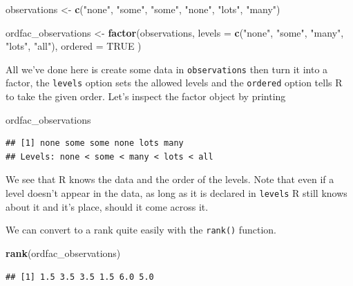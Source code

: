 \documentclass[
]{book}
\newenvironment{Shaded}{\begin{snugshade}}{\end{snugshade}}
\newcommand{\DataTypeTok}[1]{\textcolor[rgb]{0.13,0.29,0.53}{#1}}
\newcommand{\KeywordTok}[1]{\textcolor[rgb]{0.13,0.29,0.53}{\textbf{#1}}}
\newcommand{\NormalTok}[1]{#1}
\newcommand{\OtherTok}[1]{\textcolor[rgb]{0.56,0.35,0.01}{#1}}
\newcommand{\StringTok}[1]{\textcolor[rgb]{0.31,0.60,0.02}{#1}}
\begin{document}
\begin{Shaded}
\begin{Highlighting}[]
\NormalTok{observations <-}\StringTok{ }\KeywordTok{c}\NormalTok{(}\StringTok{"none"}\NormalTok{, }\StringTok{"some"}\NormalTok{, }\StringTok{"some"}\NormalTok{, }\StringTok{"none"}\NormalTok{, }\StringTok{"lots"}\NormalTok{, }\StringTok{"many"}\NormalTok{)}

\NormalTok{ordfac_observations <-}\StringTok{ }\KeywordTok{factor}\NormalTok{(observations, }
                          \DataTypeTok{levels =} \KeywordTok{c}\NormalTok{(}\StringTok{"none"}\NormalTok{, }\StringTok{"some"}\NormalTok{, }\StringTok{"many"}\NormalTok{, }\StringTok{"lots"}\NormalTok{, }\StringTok{"all"}\NormalTok{),}
                          \DataTypeTok{ordered =} \OtherTok{TRUE}
\NormalTok{                          )}
\end{Highlighting}
\end{Shaded}

All we've done here is create some data in \texttt{observations} then turn it into a factor, the \texttt{levels} option sets the allowed levels and the \texttt{ordered} option tells R to take the given order. Let's inspect the factor object by printing

\begin{Shaded}
\begin{Highlighting}[]
\NormalTok{ordfac_observations}
\end{Highlighting}
\end{Shaded}

\begin{verbatim}
## [1] none some some none lots many
## Levels: none < some < many < lots < all
\end{verbatim}

We see that R knows the data and the order of the levels. Note that even if a level doesn't appear in the data, as long as it is declared in \texttt{levels} R still knows about it and it's place, should it come across it.

We can convert to a rank quite easily with the \texttt{rank()} function.

\begin{Shaded}
\begin{Highlighting}[]
\KeywordTok{rank}\NormalTok{(ordfac_observations)}
\end{Highlighting}
\end{Shaded}

\begin{verbatim}
## [1] 1.5 3.5 3.5 1.5 6.0 5.0
\end{verbatim}
\end{document}
